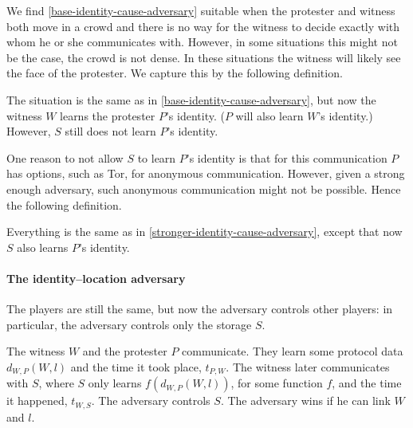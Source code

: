 We find \cref{base-identity-cause-adversary} suitable when the protester and 
witness both move in a crowd and there is no way for the witness to decide 
exactly with whom he or she communicates with.
However, in some situations this might not be the case, \eg the crowd is not 
dense.
In these situations the witness will likely see the face of the protester.
We capture this by the following definition.

\begin{definition}%
  \label{stronger-identity-cause-adversary}
  The situation is the same as in \cref{base-identity-cause-adversary}, but now the 
  witness \(W\) learns the protester \(P\)'s identity.
  (\(P\) will also learn \(W\)'s identity.)
  However, \(S\) still does not learn \(P\)'s identity.
\end{definition}

One reason to not allow \(S\) to learn \(P\)'s identity is that for this 
communication \(P\) has options, such as \ac{Tor}, for anonymous communication.
However, given a strong enough adversary, such anonymous communication might 
not be possible.
Hence the following definition.

\begin{definition}%
  \label{strongest-identity-cause-adversary}
  Everything is the same as in \cref{stronger-identity-cause-adversary}, except 
  that now \(S\) also learns \(P\)'s identity.
\end{definition}

\paragraph{The identity--location adversary}

The players are still the same, but now the adversary controls other players: 
in particular, the adversary controls only the storage \(S\).

\begin{definition}%
  \label{base-identity-location-adversary}
  The witness \(W\) and the protester \(P\) communicate.
  They learn some protocol data \(d_{W,P}(W, l)\) and the time it took place, 
  \(t_{P,W}\).
  The witness later communicates with \(S\), where \(S\) only learns 
  \(f(d_{W,P}(W, l))\), for some function \(f\), and the time it happened, 
  \(t_{W,S}\).
  The adversary controls \(S\).
  The adversary wins if he can link \(W\) and \(l\).
\end{definition}

